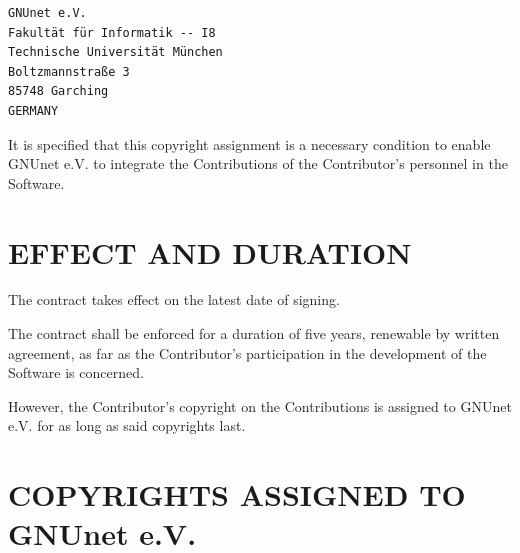 \documentclass[a4paper]{article} %
\begin{document}
\begin{verbatim}
GNUnet e.V.
Fakultät für Informatik -- I8
Technische Universität München
Boltzmannstraße 3
85748 Garching
GERMANY
\end{verbatim}

It is specified that this copyright assignment is a necessary
condition to enable GNUnet e.V. to integrate the Contributions of the
Contributor’s personnel in the Software.

\section{EFFECT AND DURATION}

The contract takes effect on the latest date of signing.

The contract shall be enforced for a duration of five years, renewable
by written agreement, as far as the Contributor’s participation in the
development of the Software is concerned.

However, the Contributor’s copyright on the Contributions is assigned
to GNUnet e.V. for as long as said copyrights last.

\section{COPYRIGHTS ASSIGNED TO GNUnet e.V.}
\end{document}
